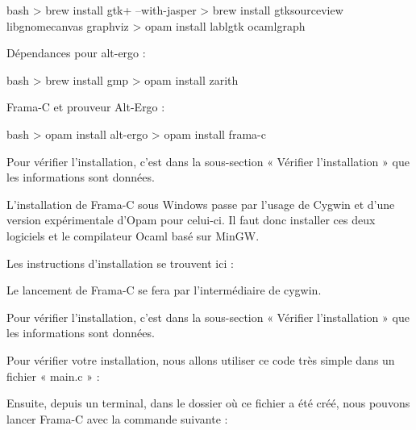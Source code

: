 \begin{CodeBlock}{bash}
> brew install gtk+ --with-jasper
> brew install gtksourceview libgnomecanvas graphviz
> opam install lablgtk ocamlgraph 
\end{CodeBlock}



Dépendances pour alt-ergo :



\begin{CodeBlock}{bash}
> brew install gmp
> opam install zarith
\end{CodeBlock}



Frama-C et prouveur Alt-Ergo :



\begin{CodeBlock}{bash}
> opam install alt-ergo
> opam install frama-c
\end{CodeBlock}



Pour vérifier l'installation, c'est dans la sous-section « Vérifier l'installation »
que les informations sont données.





L'installation de Frama-C sous Windows passe par l'usage de Cygwin et d'une
version expérimentale d'Opam pour celui-ci. Il faut donc installer ces deux
logiciels et le compilateur Ocaml basé sur MinGW.



Les instructions d'installation se trouvent ici :






Le lancement de Frama-C se fera par l'intermédiaire de cygwin.



Pour vérifier l'installation, c'est dans la sous-section « Vérifier l'installation »
que les informations sont données.





Pour vérifier votre installation, nous allons utiliser ce code très simple dans un 
fichier « main.c » :




Ensuite, depuis un terminal, dans le dossier où ce fichier a été créé,
nous pouvons lancer Frama-C avec la commande suivante :



